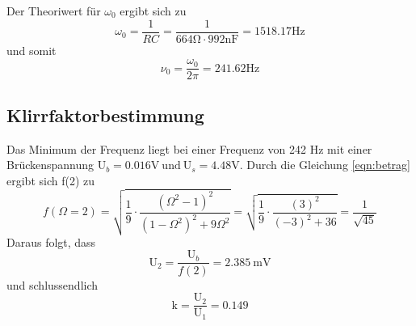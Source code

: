 Der Theoriwert für $\omega_0$ ergibt sich zu
\begin{equation*}
  \omega_0 = \frac{1}{RC} = \frac{1}{664\si{\ohm } \cdot 992\si{\nano\farad}}
  = 1518.17 \si{\hertz}
\end{equation*}
und somit
\begin{equation*}
  \nu_0 = \frac{\omega_0}{2\pi} = 241.62 \si{\hertz}
\end{equation*}

\subsection{Klirrfaktorbestimmung}

Das Minimum der Frequenz liegt bei einer Frequenz von 242 $\si{\hertz}$
mit einer Brückenspannung $\text{U}_b = 0.016 \si{\volt} \: \text{und} \:
\text{U}_s = 4.48 \si{\volt} $.
Durch die Gleichung \ref{eqn:betrag}
ergibt sich f(2) zu
\begin{equation*}
  f(\Omega =2) = \sqrt{\frac{1}{9} \cdot \frac{\left(\Omega^2-1\right)^2}{\left(1-\Omega^2
  \right)^2+9\Omega^2}} = \sqrt{\frac{1}{9} \cdot \frac{(3)^2}{(-3)^2+36}} =
  \frac{1}{\sqrt{45}}
\end{equation*}
Daraus folgt, dass
\begin{equation*}
  \text{U}_2 = \frac{\text{U}_b}{f(2)} = \SI{2.385}{\milli\volt}
\end{equation*}
und schlussendlich
\begin{equation*}
  \text{k}= \frac{\text{U}_2}{\text{U}_1} = 0.149
\end{equation*}
